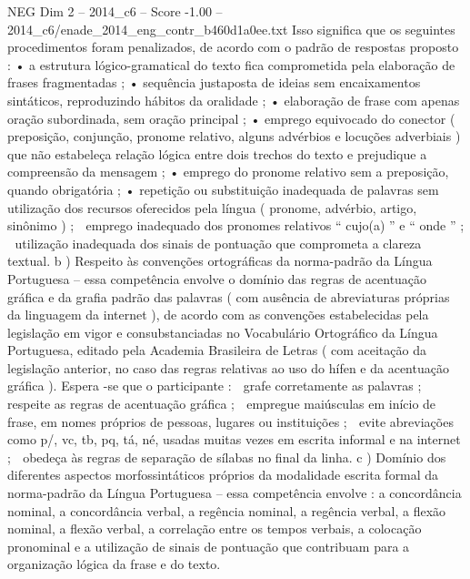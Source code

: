 \begin{textsample}{NEG Dim 2 – 2014\_c6 – Score -1.00 – 2014\_c6/enade\_2014\_eng\_contr\_b460d1a0ee.txt}
Isso significa que os seguintes procedimentos foram penalizados, de acordo com o padrão de respostas proposto : • a estrutura lógico-gramatical do texto fica comprometida pela elaboração de frases fragmentadas ; • sequência justaposta de ideias sem encaixamentos sintáticos, reproduzindo hábitos da oralidade ; • elaboração de frase com apenas oração subordinada, sem oração principal ; • emprego equivocado do conector ( preposição, conjunção, pronome relativo, alguns advérbios e locuções adverbiais ) que não estabeleça relação lógica entre dois trechos do texto e prejudique a compreensão da mensagem ; • emprego do pronome relativo sem a preposição, quando obrigatória ; • repetição ou substituição inadequada de palavras sem utilização dos recursos oferecidos pela língua ( pronome, advérbio, artigo, sinônimo ) ;  emprego inadequado dos pronomes relativos “ cujo(a) ” e “ onde ” ;  utilização inadequada dos sinais de pontuação que comprometa a clareza textual. b ) Respeito às convenções ortográficas da norma-padrão da Língua Portuguesa – essa competência envolve o domínio das regras de acentuação gráfica e da grafia padrão das palavras ( com ausência de abreviaturas próprias da linguagem da internet ), de acordo com as convenções estabelecidas pela legislação em vigor e consubstanciadas no Vocabulário Ortográfico da Língua Portuguesa, editado pela Academia Brasileira de Letras ( com aceitação da legislação anterior, no caso das regras relativas ao uso do hífen e da acentuação gráfica ).
Espera -se que o participante :  grafe corretamente as palavras ;  respeite as regras de acentuação gráfica ;  empregue maiúsculas em início de frase, em nomes próprios de pessoas, lugares ou instituições ;  evite abreviações como p/, vc, tb, pq, tá, né, usadas muitas vezes em escrita informal e na internet ;  obedeça às regras de separação de sílabas no final da linha. c ) Domínio dos diferentes aspectos morfossintáticos próprios da modalidade escrita formal da norma-padrão da Língua Portuguesa – essa competência envolve : a concordância nominal, a concordância verbal, a regência nominal, a regência verbal, a flexão nominal, a flexão verbal, a correlação entre os tempos verbais, a colocação pronominal e a utilização de sinais de pontuação que contribuam para a organização lógica da frase e do texto.

\end{textsample}
